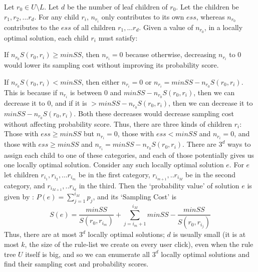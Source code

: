 Let $r_0 \in U \setminus L$. Let $d$ be the number of leaf children of $r_0$. Let the children be $r_1, r_2, ... r_d$. For any child $r_i$, $n_{r_i}$ only contributes to its own $ess$, whereas $n_{r_0}$ contributes to the $ess$ of all children $r_1, ... r_d$. Given a value of $n_{r_0}$, in a locally optimal solution, each child $r_i$ must satisfy:
\squishlist
\item If $n_{r_0}S(r_0, r_i) \geq minSS$, then $n_{r_i} = 0$ because otherwise, decreasing $n_{r_i}$ to $0$ would lower its sampling cost without improving its probability score. 
\item If $n_{r_0}S(r_0, r_i) < minSS$, then either $n_{r_i} = 0$ or $n_{r_i} = minSS - n_{r_0}S(r_0, r_i)$. This is because if $n_{r_i}$ is between $0$ and $minSS - n_{r_0}S(r_0, r_i)$, then we can decrease it to $0$, and if it is $> minSS - n_{r_0}S(r_0, r_i)$, then we can decrease it to $minSS - n_{r_0}S(r_0, r_i)$. Both these decreases would decrease sampling cost without affecting probability score. 
\squishend
Thus, there are three kinds of children $r_i$: Those with $ess \geq minSS$ but $n_{r_i} = 0$, those with $ess < minSS$ and $n_{r_i} = 0$, and those with $ess \geq minSS$ and $n_{r_i} = minSS - n_{r_0}S(r_0, r_i)$. There are $3^d$ ways to assign each child to one of these categories, and each of those potentially gives us one locally optimal solution. Consider any such locally optimal solution $e$. For $e$ let children $r_{i_1}, r_{i_2}, ... r_{i_m}$ be in the first category, $r_{i_{m+1}}, .. r_{i_M}$ be in the second category, and $r_{i_{M+1}}, .. r_{i_d}$ in the third.  Then the `probability value' of solution $e$ is given by : 
$P(e) = \sum_{j = 1}^{i_M}p_{j}$,
and its `Sampling Cost' is
$$S(e) = \frac{minSS}{S(r_0, r_{i_m})} + \sum_{j=i_m+1}^{i_M} minSS - \frac{minSS}{S(r_0, r_{i_j})}$$
Thus, there are at most $3^d$ locally optimal solutions; $d$ is usually small (it is at most $k$, the size of the rule-list we create on every user click), even when the rule tree $U$ itself is big, and so we can enumerate all $3^d$ locally optimal solutions and find their sampling cost and probability scores. 

\begin{comment}
Let $r_0 \in U \setminus L$. Let $d$ be the number of leaf children of $r_0$. Let the children be $r_1, r_2, ... r_d$, ordered such that $S(r_0, r_i) > S(r_0, r_j) \forall i > j$. Then we can show that for any locally optimal solution, there exist integers $i_m, i_M$ such that the following conditions hold:
$$1 \leq i_m \leq i_M \leq d$$
$$n_{r_0} = \frac{minSS}{S(r_0, r_{i_m})}$$
$$1 \leq j \leq i_m \Rightarrow n_{r_j} = 0$$
$$i_m < j \leq i_M \Leftrightarrow n_{r_j} = minSS - \frac{minSS}{S(r_0, r_{i_j})}$$
$$i_M < j \Rightarrow n_{r_j} = 0$$
And Thus,
$$ess(r_j) \geq minSS \Leftrightarrow j \leq i_M$$

Call this locally optimal solution $e$. Then we define its `probability value' to be
$$P(e) = \sum_{j = 1}^{i_M}p_{j}$$
and its `Sampling Cost' to be
$$S(e) = \frac{minSS}{S(r_0, r_{i_m})} + \sum_{j=i_m+1}^{i_M} minSS - \frac{minSS}{S(r_0, r_{i_j})}$$
Since there are at most $d^2$ possible values of $i_m$ and $i_M$, we can try out all of them and obtain all locally optimal solutions. 
\end{comment}

